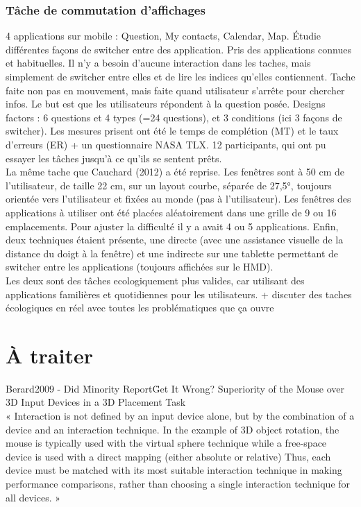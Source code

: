 \subsubsection{Tâche de commutation d'affichages}
4 applications sur mobile : Question, My contacts, Calendar, Map. Étudie différentes façons de switcher entre des application. Pris des applications connues et habituelles. Il n'y a besoin d'aucune interaction dans les taches, mais simplement de switcher entre elles et de lire les indices qu'elles contiennent. Tache faite non pas en mouvement, mais faite quand utilisateur s'arrête pour chercher infos. Le but est que les utilisateurs répondent à la question posée. Designs factors : 6 questions et 4 types (=24 questions), et 3 conditions (ici 3 façons de switcher). Les mesures prisent ont été le temps de complétion (MT) et le taux d'erreurs (ER) + un questionnaire NASA TLX. 12 participants, qui ont pu essayer les tâches jusqu'à ce qu'ils se sentent prêts. \cite{CauchardLoechtefeldFraserEtAl2012}\\
La même tache que Cauchard (2012) a été reprise. Les fenêtres sont à 50 cm de l'utilisateur, de taille 22 cm, sur un layout courbe, séparée de 27,5°, toujours orientée vers l'utilisateur et fixées au monde (pas à l'utilisateur). Les fenêtres des applications à utiliser ont été placées aléatoirement dans une grille de 9 ou 16 emplacements. Pour ajuster la difficulté il y a avait 4 ou 5 applications. Enfin, deux techniques étaient présente, une directe (avec une assistance visuelle de la distance du doigt à la fenêtre) et une indirecte sur une tablette permettant de switcher entre les applications (toujours affichées sur le HMD). \cite{EnsFinneganIrani2014}\\
Les deux sont des tâches ecologiquement plus valides, car utilisant des applications familières et quotidiennes pour les utilisateurs. + discuter  des taches écologiques en réel avec toutes les problématiques que ça ouvre \cite{KoelleKranzMoeller2015} \cite{DenningDehlawiKohno2014}



\section{À traiter}
Berard2009 - Did \"Minority Report\" Get It Wrong? Superiority of the Mouse over 3D Input Devices in a 3D Placement Task\\
« Interaction is not defined by an input device alone, but by the combination of a device and an interaction technique. In the example of 3D object rotation, the mouse is typically used with the virtual sphere technique while a free-space device is used with a direct mapping (either absolute or relative) Thus, each device must be matched with its most suitable interaction technique in making performance comparisons, rather than choosing a single interaction technique for all devices. »

